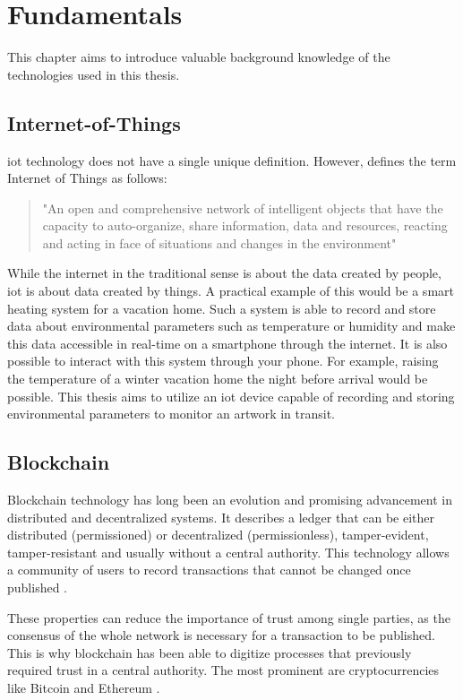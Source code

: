 \chapter{Fundamentals} %
\label{chap:technologies}
This chapter aims to introduce valuable background knowledge of the technologies used in this thesis.

\section{Internet-of-Things}
\gls{iot} technology does not have a single unique definition. However, \textcite{iot} defines the term Internet of Things as follows: %
\begin{quote}
    "An open and comprehensive network of intelligent objects that have the capacity to auto-organize, share information, data and resources, reacting and acting in face of situations and changes in the environment"
\end{quote}
While the internet in the traditional sense is about the data created by people, \gls{iot} is about data created by things. A practical example of this would be a smart heating system for a vacation home. Such a system is able to record and store data about environmental parameters such as temperature or humidity and make this data accessible in real-time on a smartphone through the internet. It is also possible to interact with this system through your phone. For example, raising the temperature of a winter vacation home the night before arrival would be possible. This thesis aims to utilize an \gls{iot} device capable of recording and storing environmental parameters to monitor an artwork in transit.

\section{Blockchain}
Blockchain technology has long been an evolution and promising advancement in distributed and decentralized systems. It describes a ledger that can be either distributed (permissioned) or decentralized (permissionless), tamper-evident, tamper-resistant and usually without a central authority. This technology allows a community of users to record transactions that cannot be changed once published \parencite{blockchainoverview}.

These properties can reduce the importance of trust among single parties, as the consensus of the whole network is necessary for a transaction to be published. This is why blockchain has been able to digitize processes that previously required trust in a central authority. The most prominent are cryptocurrencies like Bitcoin and Ethereum \cite{bitcoin, ethereum}.

